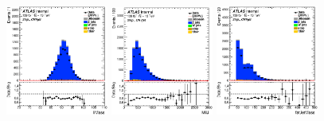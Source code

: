 \begin{figure}[ht]
 \centering
   \includegraphics[width=0.30\textwidth]{figures/2lep/reweighting/after_reweighting/C_0ptag1pfat0pjet_0ptv_CRVjet_llMass_Lin.eps}
   \includegraphics[width=0.30\textwidth]{figures/2lep/reweighting/after_reweighting/C_0ptag1pfat0pjet_0ptv_CRVjet_MllJ_Lin.eps}
   \includegraphics[width=0.30\textwidth]{figures/2lep/reweighting/after_reweighting/C_0ptag1pfat0pjet_0ptv_CRVjet_fatJetMass_Lin.eps} \\


\end{figure}
